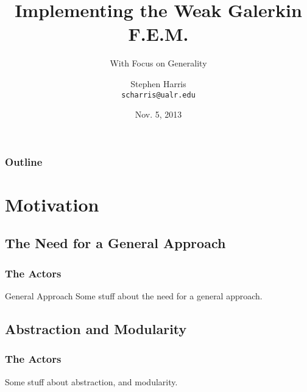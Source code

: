 \documentclass{beamer}
\title[Implementing WGFEM]{Implementing the Weak Galerkin F.E.M.}
\subtitle{With Focus on Generality}
\author{Stephen Harris \\ \texttt{scharris@ualr.edu}}
\date{Nov. 5, 2013}
\begin{document}
\begin{frame}
  \titlepage
\end{frame}

\begin{frame}
  \frametitle{Outline}
  \tableofcontents[pausesections]
\end{frame}

\section{Motivation}
\subsection{The Need for a General Approach}

\begin{frame}
  \frametitle{The Actors}
  \begin{block}{General Approach}
    Some stuff about the need for a general approach.
  \end{block}
\end{frame}

\subsection{Abstraction and Modularity}

\begin{frame}
  \frametitle{The Actors}
Some stuff about abstraction, and modularity.
\end{frame}
\end{document}
